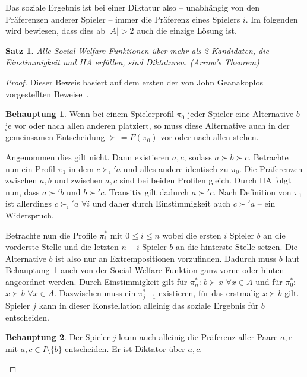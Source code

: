 \documentclass[a4paper,11pt]{article}
\theoremstyle{definition}
\theoremstyle{plain}
\newtheorem{theorem}[definition]{Satz}
\theoremstyle{definition}
\newtheorem{claim}{Behauptung}
\begin{document}
Das soziale Ergebnis ist bei einer Diktatur also -- unabhängig von den Präferenzen anderer Spieler -- immer die Präferenz eines Spielers $i$.
Im folgenden wird bewiesen, dass dies ab $|A| > 2$ auch die einzige Lösung ist.

\begin{theorem}
	Alle Social Welfare Funktionen über mehr als 2 Kandidaten, die Einstimmigkeit und IIA erfüllen, sind Diktaturen. (Arrow's Theorem)
\end{theorem}

\begin{proof}
	Dieser Beweis basiert auf dem ersten der von John Geanakoplos vorgestellten Beweise~\cite{gea05}.
	
	\begin{claim} 
		\label{claim:extrementsch}
		Wenn bei einem Spielerprofil $\pi_0$ jeder Spieler eine Alternative $b$ je vor oder nach allen anderen platziert, so muss diese Alternative auch in der gemeinsamen Entscheidung $\succ = F(\pi_0)$ vor oder nach allen stehen.
	\end{claim}

	Angenommen dies gilt nicht. Dann existieren $a, c$, sodass $a \succ b \succ c$. Betrachte nun ein Profil $\pi_1$ in dem $c \succ_i' a$ und alles andere identisch zu $\pi_0$. Die Präferenzen zwischen $a, b$ und zwischen $a, c$ sind bei beiden Profilen gleich. Durch IIA folgt nun, dass $a \succ' b$ und $b \succ' c$. Transitiv gilt dadurch $a \succ' c$. Nach Definition von $\pi_1$ ist allerdings $c \succ_i' a$ $\forall i$ und daher durch Einstimmigkeit auch $c \succ' a$ -- ein Widerspruch.
	
	Betrachte nun die Profile $\pi_i^*$ mit $0 \leq i \leq n$ wobei die ersten $i$ Spieler $b$ an die vorderste Stelle und die letzten $n-i$ Spieler $b$ an die hinterste Stelle setzen. Die Alternative $b$ ist also nur an Extrempositionen vorzufinden. Dadurch muss $b$ laut Behauptung~\ref{claim:extrementsch} auch von der Social Welfare Funktion ganz vorne oder hinten angeordnet werden. Durch Einstimmigkeit gilt für $\pi_n^*$: $b \succ x$ $\forall x \in A$ und für $\pi_0^*$:  $x \succ b$ $\forall x \in A$. Dazwischen muss ein $\pi_{j-1}^*$ existieren, für das erstmalig $x \succ b$ gilt. Spieler $j$ kann in dieser Konstellation alleinig das soziale Ergebnis für $b$ entscheiden.
	
	\begin{claim}
		\label{claim:jdiktac}
		Der Spieler $j$ kann auch alleinig die Präferenz aller Paare $a,c$ mit $a, c \in I \setminus \{b\}$ entscheiden. Er ist Diktator über $a,c$.
	\end{claim}


\end{proof}
\end{document}

